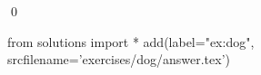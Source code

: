 \begin{ex}
  \label{ex:dog}
  
  \qed
\end{ex}
\begin{python0}
from solutions import *
add(label="ex:dog",
    srcfilename='exercises/dog/answer.tex') 
\end{python0}                              
